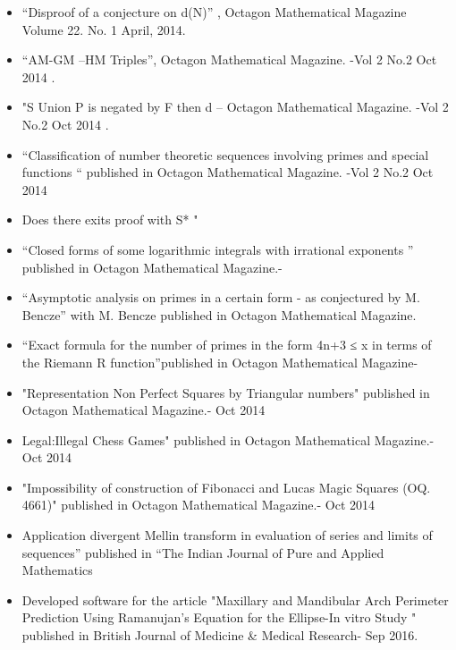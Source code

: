 \documentclass[]{deedy-resume-openfont}
\begin{document}
\begin{itemize}
\item “Disproof of a conjecture on d(N)” , Octagon Mathematical  Magazine  Volume 22. No. 1 April, 2014.
\item “AM-GM –HM Triples”, Octagon Mathematical Magazine. -Vol 2 No.2  Oct 2014 .
\item "S Union P is negated by F then d --  Octagon Mathematical Magazine. -Vol 2 No.2  Oct 2014 .
\item  “Classification of number theoretic sequences involving primes and special functions “ published in  Octagon Mathematical Magazine. -Vol 2 No.2  Oct 2014 
\item Does there exits proof with S* "
\item  “Closed forms of some logarithmic integrals with irrational exponents ”  published in Octagon Mathematical Magazine.- 
\item “Asymptotic analysis on primes in a certain form - as conjectured by M. Bencze” with M. Bencze  published in Octagon Mathematical Magazine.
\item “Exact formula for the number of primes in the form 4n+3 ≤ x in terms of the Riemann R function”published in Octagon Mathematical Magazine-
\item "Representation Non Perfect Squares by Triangular numbers" published in Octagon Mathematical Magazine.- Oct 2014
\item Legal:Illegal Chess Games"  published in Octagon Mathematical Magazine.- Oct 2014
\item 
"Impossibility of construction of Fibonacci and Lucas Magic Squares (OQ. 4661)" published in Octagon Mathematical Magazine.- Oct 2014
\item Application divergent Mellin transform in evaluation of series and limits of sequences”  published in “The Indian Journal of Pure and Applied Mathematics
\item Developed software for the article "Maxillary and Mandibular Arch Perimeter Prediction Using Ramanujan's Equation for the Ellipse-In vitro Study " published in  British Journal of Medicine & Medical Research- Sep 2016.
\end{itemize}
\sectionsep
\end{document}
